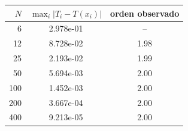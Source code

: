 \begin{tabular}{r c c}
\toprule
$N$ & $\max_i|T_i-T(x_i)|$ & orden observado\\
\midrule
6 & 2.978e-01 & --\\
12 & 8.728e-02 & 1.98\\
25 & 2.193e-02 & 1.99\\
50 & 5.694e-03 & 2.00\\
100 & 1.452e-03 & 2.00\\
200 & 3.667e-04 & 2.00\\
400 & 9.213e-05 & 2.00\\
\bottomrule
\end{tabular}

